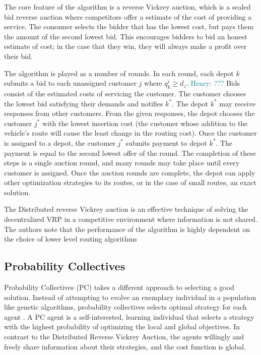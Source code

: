\documentclass{sig-alternate}
\newcommand{\allcomments}[1]{{#1}}
\newcommand{\hfcomment}[1]{\textcolor{Teal}{\allcomments{Henry: {#1}}}}
\begin{document}
The core feature of the algorithm is a reverse Vickrey auction, which is a sealed bid reverse auction where competitors offer a estimate of the cost of providing a service. The consumer selects the bidder that has the lowest cost, but pays them the amount of the second lowest bid. This encourages bidders to bid an honest estimate of cost; in the case that they win, they will always make a profit over their bid.

The algorithm is played as a number of rounds. In each round, each depot $k$ submits a bid to each unassigned customer $j$ where $q_k^i \geq d_z$. \hfcomment{???} Bids consist of the estimated costs of servicing the customer. The customer chooses the lowest bid satisfying their demands and notifies $k^*$. The depot $k^*$ may receive responses from other customers. From the given responses, the depot chooses the customer $j^*$ with the lowest insertion cost (the customer whose addition to  the vehicle's route will cause the least change  in the routing cost). Once the customer is assigned to a depot, the customer $j^*$ submits payment to depot $k^*$. The payment is equal to the second lowest offer of the round. The completion of these steps is a single auction round, and many rounds may take place until every customer is assigned. Once the auction rounds are complete, the depot can apply other optimization strategies to its routes, or in the case of small routes, an exact solution.

The Distributed reverse Vickrey auction is an effective technique of solving the decentralized VRP in a competitive environment where information is not shared. The authors note that the performance of the algorithm is highly dependent on the choice of lower level routing algorithms
\subsection{Probability Collectives}
\label{ssec:PC}
Probability Collectives (PC) takes a different approach to selecting a good solution. Instead of attempting to evolve an exemplary individual in a population like genetic algorithms, probability collectives selects optimal strategy for each agent \cite{Kulkarni:2008}. A PC agent is a self-interested, learning individual that selects a strategy with the highest probability of optimizing the local and global objectives. In contrast to the Distributed Reverse Vickrey Auction, the agents willingly and freely share information about their strategies, and the cost function is global.
\end{document}
